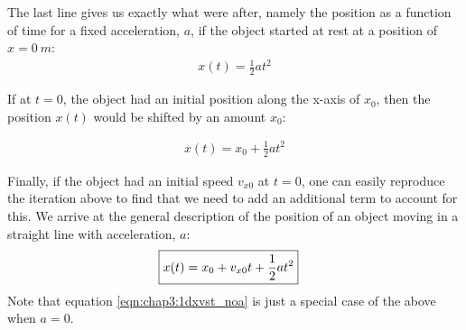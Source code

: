 The last line gives us exactly what were after, namely the position as a function of time for a fixed acceleration, $a$, if the object started at rest at a position of $x=\SI{0}{m}$:
\begin{align}
\label{eqn:chap3:1dxoft_novonoxo}
 x(t) = \frac{1}{2} a t^2
\end{align}

If at $t=0$, the object had an initial position along the x-axis of $x_0$, then the position $x(t)$ would be shifted by an amount $x_0$:

\begin{align}
\label{eqn:chap3:1dxoft_novo}
 x(t) = x_0+\frac{1}{2} a t^2
\end{align}

Finally, if the object had an initial speed $v_{x0}$ at $t=0$, one can easily reproduce the iteration above to find that we need to add an additional term to account for this. We arrive at the general description of the position of an object moving in a straight line with acceleration, $a$:
\begin{align}
\label{eqn:chap3:1dxvst}
\Aboxed{ x(t) = x_0+v_{x0}t+ \frac{1}{2}at^2}
\end{align}
Note that equation \ref{eqn:chap3:1dxvst_noa} is just a special case of the above when $a=0$. 

